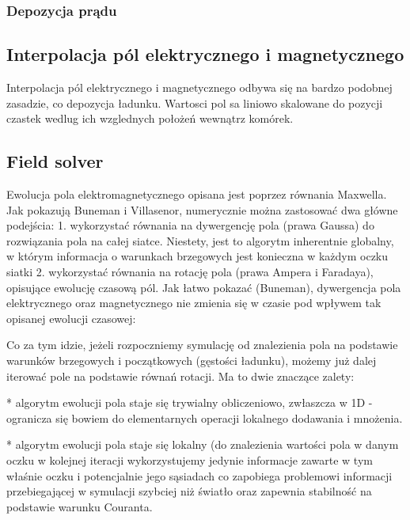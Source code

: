    \subsubsection{Depozycja prądu}



    \subsection{Interpolacja pól elektrycznego i magnetycznego}

    Interpolacja pól elektrycznego i magnetycznego odbywa się na bardzo podobnej
    zasadzie, co depozycja ładunku. Wartosci pol sa liniowo skalowane do pozycji
    czastek wedlug ich wzglednych położeń wewnątrz komórek.

    \subsection{Field solver} 

    Ewolucja pola elektromagnetycznego opisana jest poprzez równania Maxwella.
    Jak pokazują Buneman i Villasenor, numerycznie można zastosować dwa główne
    podejścia:  1. wykorzystać równania na dywergencję
    pola (prawa Gaussa) do rozwiązania pola na całej siatce. Niestety, jest to
    algorytm inherentnie globalny, w którym informacja o warunkach brzegowych
    jest konieczna w każdym oczku siatki
    2. wykorzystać równania na rotację pola (prawa Ampera i Faradaya), opisujące ewolucję czasową pól. Jak łatwo pokazać (Buneman),
    dywergencja pola elektrycznego oraz magnetycznego nie zmienia się w czasie pod wpływem tak opisanej ewolucji czasowej:

    Co za tym idzie, jeżeli rozpoczniemy symulację od znalezienia pola na
    podstawie warunków brzegowych i początkowych (gęstości ładunku), możemy już
    dalej iterować pole na podstawie równań rotacji. Ma to dwie znaczące
    zalety:

    * algorytm ewolucji pola staje się trywialny obliczeniowo,
    zwłaszcza w 1D - ogranicza się bowiem do elementarnych operacji lokalnego
    dodawania i mnożenia.

    * algorytm ewolucji pola staje się lokalny (do
    znalezienia wartości pola w danym oczku w kolejnej iteracji wykorzystujemy
    jedynie informacje zawarte w tym właśnie oczku i potencjalnie jego
    sąsiadach  co zapobiega
    problemowi informacji przebiegającej w symulacji szybciej niż światło oraz
    zapewnia stabilność na podstawie
    warunku Couranta.

